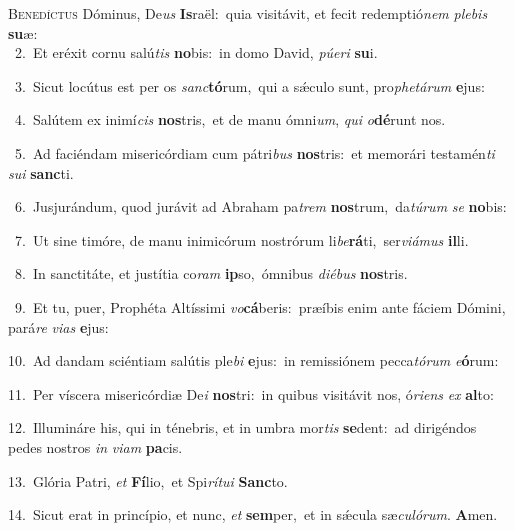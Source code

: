 \lettrine{\initial\textcolor{\initialcolor}{B}}{enedíctus} Dóminus, De\textit{us} \textbf{Is}\-raël:~\star quia visitávit, et fecit redemptió\textit{nem} \textit{ple}\-\textit{bis} \textbf{su}\-æ:\\
{\numbfont\textcolor{\numbcolor}{~2.}}~Et eréxit cornu salú\textit{tis} \textbf{no}\-bis:~\star in domo David, \textit{pú}\-\textit{e}\textit{ri} \textbf{su}\-i.\par
{\numbfont\textcolor{\numbcolor}{~3.}}~Sicut locútus est per os \textit{sanc}\-\textbf{tó}rum,~\star qui a sǽculo sunt, pro\-\textit{phe}\-\textit{tá}\textit{rum} \textbf{e}\-jus:\par
{\numbfont\textcolor{\numbcolor}{~4.}}~Salútem ex inimí\textit{cis} \textbf{nos}\-tris,~\star et de manu ómni\-\textit{um}\-, \textit{qui} \textit{o}\-\textbf{dé}runt nos.\par
{\numbfont\textcolor{\numbcolor}{~5.}}~Ad faciéndam misericórdiam cum pátri\textit{bus} \textbf{nos}\-tris:~\star et memorári testamén\textit{ti} \textit{su}\-\textit{i} \textbf{sanc}\-ti.\par
{\numbfont\textcolor{\numbcolor}{~6.}}~Jusjurándum, quod jurávit ad Abraham pa\textit{trem} \textbf{nos}\-trum,~\star da\-\textit{tú}\-\textit{rum} \textit{se} \textbf{no}\-bis:\par
{\numbfont\textcolor{\numbcolor}{~7.}}~Ut sine timóre, de manu inimicórum nostrórum li\-\textit{be}\-\textbf{rá}ti,~\star ser\-\textit{vi}\-\textit{á}\textit{mus} \textbf{il}\-li.\par
{\numbfont\textcolor{\numbcolor}{~8.}}~In sanctitáte, et justítia co\textit{ram} \textbf{ip}\-so,~\star ómnibus \textit{di}\-\textit{é}\textit{bus} \textbf{nos}\-tris.\par
{\numbfont\textcolor{\numbcolor}{~9.}}~Et tu, puer, Prophéta Altíssimi \textit{vo}\-\textbf{cá}beris:~\star præíbis enim ante fáciem Dómini, pará\textit{re} \textit{vi}\-\textit{as} \textbf{e}\-jus:\par
{\numbfont\textcolor{\numbcolor}{10.}}~Ad dandam sciéntiam salútis ple\textit{bi} \textbf{e}\-jus:~\star in remissiónem pecca\-\textit{tó}\-\textit{rum} \textit{e}\-\textbf{ó}rum:\par
{\numbfont\textcolor{\numbcolor}{11.}}~Per víscera misericórdiæ De\textit{i} \textbf{nos}\-tri:~\star in quibus visitávit nos, ó\-\textit{ri}\-\textit{ens} \textit{ex} \textbf{al}\-to:\par
{\numbfont\textcolor{\numbcolor}{12.}}~Illumináre his, qui in ténebris, et in umbra mor\textit{tis} \textbf{se}\-dent:~\star ad dirigéndos pedes nostros \textit{in} \textit{vi}\-\textit{am} \textbf{pa}\-cis.\par
{\numbfont\textcolor{\numbcolor}{13.}}~Glória Patri, \textit{et} \textbf{Fí}\-lio,~\star et Spi\-\textit{rí}\-\textit{tu}\textit{i} \textbf{Sanc}\-to.\par
{\numbfont\textcolor{\numbcolor}{14.}}~Sicut erat in princípio, et nunc, \textit{et} \textbf{sem}\-per,~\star et in sǽcula sæ\-\textit{cu}\-\textit{ló}\textit{rum}. \textbf{A}\-men.\par
